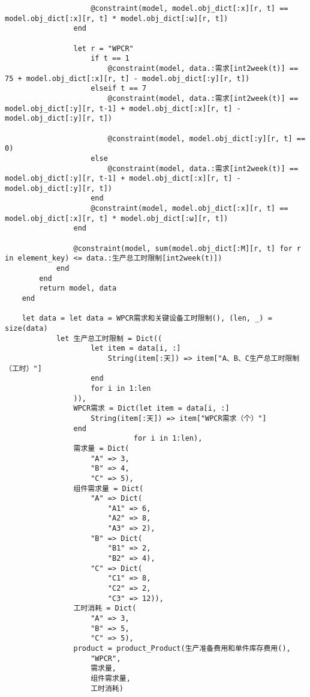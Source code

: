 \begin{appendices}
\begin{lstlisting}
                    @constraint(model, model.obj_dict[:x][r, t] == model.obj_dict[:x][r, t] * model.obj_dict[:ω][r, t])
                end

                let r = "WPCR"
                    if t == 1
                        @constraint(model, data.:需求[int2week(t)] == 75 + model.obj_dict[:x][r, t] - model.obj_dict[:y][r, t])
                    elseif t == 7
                        @constraint(model, data.:需求[int2week(t)] == model.obj_dict[:y][r, t-1] + model.obj_dict[:x][r, t] - model.obj_dict[:y][r, t])

                        @constraint(model, model.obj_dict[:y][r, t] == 0)
                    else
                        @constraint(model, data.:需求[int2week(t)] == model.obj_dict[:y][r, t-1] + model.obj_dict[:x][r, t] - model.obj_dict[:y][r, t])
                    end
                    @constraint(model, model.obj_dict[:x][r, t] == model.obj_dict[:x][r, t] * model.obj_dict[:ω][r, t])
                end

                @constraint(model, sum(model.obj_dict[:M][r, t] for r in element_key) <= data.:生产总工时限制[int2week(t)])
            end
        end
        return model, data
    end

    let data = let data = WPCR需求和关键设备工时限制(), (len, _) = size(data)
            let 生产总工时限制 = Dict((
                    let item = data[i, :]
                        String(item[:天]) => item["A、B、C生产总工时限制（工时）"]
                    end
                    for i in 1:len
                )),
                WPCR需求 = Dict(let item = data[i, :]
                    String(item[:天]) => item["WPCR需求（个）"]
                end
                              for i in 1:len),
                需求量 = Dict(
                    "A" => 3,
                    "B" => 4,
                    "C" => 5),
                组件需求量 = Dict(
                    "A" => Dict(
                        "A1" => 6,
                        "A2" => 8,
                        "A3" => 2),
                    "B" => Dict(
                        "B1" => 2,
                        "B2" => 4),
                    "C" => Dict(
                        "C1" => 8,
                        "C2" => 2,
                        "C3" => 12)),
                工时消耗 = Dict(
                    "A" => 3,
                    "B" => 5,
                    "C" => 5),
                product = product_Product(生产准备费用和单件库存费用(),
                    "WPCR",
                    需求量,
                    组件需求量,
                    工时消耗)


\end{lstlisting}
\end{appendices}
